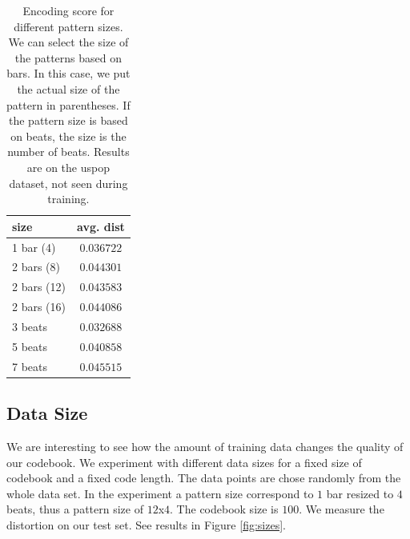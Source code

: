 \documentclass{article}
\begin{document}
\begin{table}
\begin{center}
\begin{tabular}{|l|c|}
\hline
size & avg. dist \\ \hline \hline
1 bar (4) & $0.036722$\\
2 bars (8) & $0.044301$\\
2 bars (12) & $0.043583$\\
2 bars (16) & $0.044086$ \\ \hline
3 beats & $0.032688$\\
5 beats & $0.040858$\\
7 beats & $0.045515$\\ \hline
\end{tabular}
\end{center}
\caption{{Encoding score for different pattern sizes. We can select the
size of the patterns based on bars. In this case, we put the actual size
of the pattern in parentheses. If the pattern size is based on beats, the
size is the number of beats. Results are on the uspop dataset, not seen
during training.}}
\label{tab:psize}
\end{table}


\subsection{Data Size}
We are interesting to see how the amount of training data changes
the quality of our codebook.
We experiment with different data sizes for a fixed size of codebook and a 
fixed code length. The data points are chose randomly from the whole
data set.
In the experiment a pattern size correspond to $1$ bar resized to $4$
beats, thus a pattern size of $12$x$4$. The codebook size is $100$.
We measure the distortion on our test set. 
See results in Figure \ref{fig:sizes}.
\end{document}
